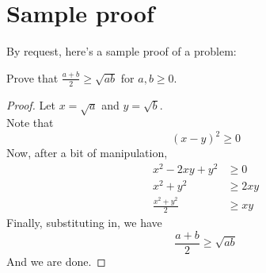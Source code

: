 \documentclass[a4paper]{scrartcl}
\begin{document}
	\section{Sample proof}
	By request, here's a sample proof of a problem:
	\begin{problem*}
		Prove that $\frac{a + b}{2} \geq \sqrt{ab}$ for $a,b \geq 0$.
	\end{problem*}
	\begin{proof}
		Let $x=\sqrt{a}$ and $y=\sqrt{b}$. \\
		Note that 
		\[(x-y)^2 \geq 0\]
		Now, after a bit of manipulation,
		\begin{align*}
			x^2 - 2xy + y^2 &\geq 0 \\
			x^2 + y^2 &\geq 2xy \\
			\frac{x^2+y^2}{2} &\geq xy
		\end{align*}
		Finally, substituting in, we have 
		\[\frac{a+b}{2} \geq \sqrt{ab}\]
		And we are done.
	\end{proof}
\end{document}
